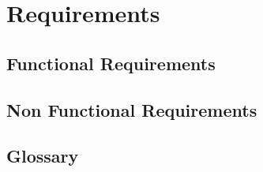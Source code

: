 \newpage




\chapter{Requirements}
\label{Requirements}

\section{Functional Requirements}
\section{Non Functional Requirements}

\begin{appendices}
\chapter{Glossary}


\end{appendices}


